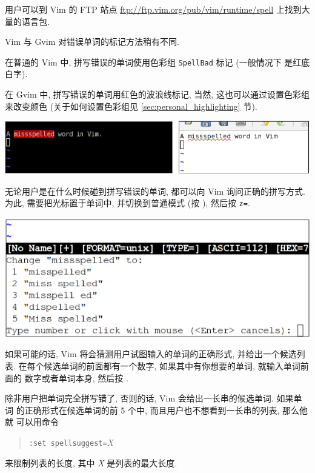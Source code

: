 \begin{warning}
    用户可以到 Vim 的 FTP 站点 \url{ftp://ftp.vim.org/pub/vim/runtime/spell}
    上找到大量的语言包.
\end{warning}

Vim 与 Gvim 对错误单词的标记方法稍有不同.

在普通的 Vim 中, 拼写错误的单词使用色彩组 \texttt{SpellBad} 标记 (一般情况下 
是红底白字).

在 Gvim 中, 拼写错误的单词用红色的波浪线标记, 当然, 这也可以通过设置色彩组
来改变颜色 (关于如何设置色彩组见 \ref{sec:personal_highlighting} 节).

\begin{center}
    \includegraphics[scale=0.6]{./images/page42-1.png}
\end{center}

无论用户是在什么时候碰到拼写错误的单词, 都可以向 Vim 询问正确的拼写方式.
为此, 需要把光标置于单词中, 并切换到普通模式 (按 ), 然后按
\texttt{z=}.

\begin{center}
    \includegraphics[scale=0.6]{./images/page42-2.png}
\end{center}

如果可能的话, Vim 将会猜测用户试图输入的单词的正确形式, 并给出一个候选列表.
在每个候选单词的前面都有一个数字, 如果其中有你想要的单词, 就输入单词前面的
数字或者单词本身, 然后按 .

除非用户把单词完全拼写错了, 否则的话, Vim 会给出一长串的候选单词. 如果单词 
的正确形式在候选单词的前 5 个中, 而且用户也不想看到一长串的列表, 那么他就
可以用命令
\begin{quotation}
    \texttt{:set spellsuggest=}\textit{X}
\end{quotation}
来限制列表的长度, 其中 \textit{X} 是列表的最大长度.

